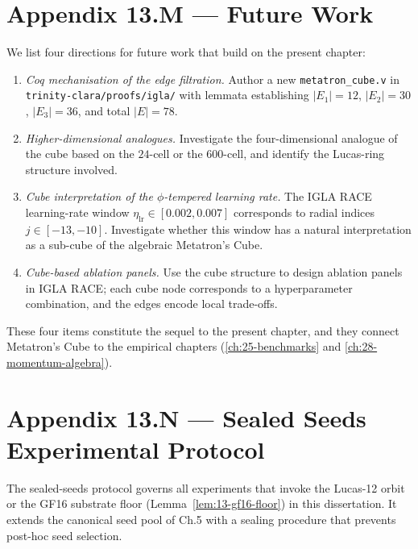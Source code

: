 \section*{Appendix 13.M --- Future Work}
\label{fa_13:sec:13-appM}

We list four directions for future work that build on the present
chapter:

\begin{enumerate}
\item \emph{Coq mechanisation of the edge filtration.} Author a
  new \verb|metatron_cube.v| in
  \verb|trinity-clara/proofs/igla/| with lemmata establishing
  $|E_{1}| = 12$, $|E_{2}| = 30$, $|E_{3}| = 36$, and total
  $|E| = 78$.
\item \emph{Higher-dimensional analogues.} Investigate the
  four-dimensional analogue of the cube based on the $24$-cell
  or the $600$-cell, and identify the Lucas-ring structure
  involved.
\item \emph{Cube interpretation of the $\phi$-tempered learning
  rate.} The IGLA RACE learning-rate window
  $\eta_{\mathrm{lr}} \in [0.002, 0.007]$ corresponds to radial
  indices $j \in [-13, -10]$. Investigate whether this window
  has a natural interpretation as a sub-cube of the algebraic
  Metatron's Cube.
\item \emph{Cube-based ablation panels.} Use the cube structure
  to design ablation panels in IGLA RACE; each cube node
  corresponds to a hyperparameter combination, and the edges
  encode local trade-offs.
\end{enumerate}

These four items constitute the sequel to the present chapter,
and they connect Metatron's Cube to the empirical chapters
(\ref{ch:25-benchmarks} and \ref{ch:28-momentum-algebra}).

\section*{Appendix 13.N --- Sealed Seeds Experimental Protocol}
\label{sec:13-appN-sealed-seeds}

The sealed-seeds protocol governs all experiments that invoke
the Lucas-12 orbit or the GF16 substrate floor
(Lemma~\ref{lem:13-gf16-floor}) in this dissertation.  It extends
the canonical seed pool of Ch.5 with a sealing procedure that
prevents post-hoc seed selection.

